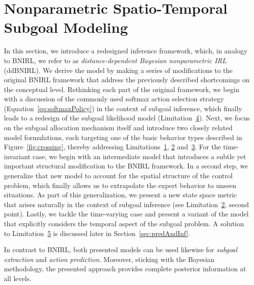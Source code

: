 \documentclass[twoside,11pt]{article}
\begin{document}
\section{Nonparametric Spatio-Temporal Subgoal Modeling}
\label{sec:ddBNIRL}
In this section, we introduce 
%
a redesigned inference framework, which, in analogy to BNIRL, we refer to as \textit{distance-dependent Bayesian nonparametric IRL} (ddBNIRL). %
We derive the model by making a series of modifications to the original BNIRL framework %
that address the previously described shortcomings %
%
on the conceptual level. %
Rethinking each part of the original framework, we begin with a discussion of the commonly used softmax action selection strategy (Equation~\ref{eq:softmaxPolicy}) in the context of subgoal %
inference, which finally leads to a redesign of the subgoal likelihood model %
(Limitation~\hyperref[phantom:lim4]{4}). Next, we focus on the subgoal allocation mechanism itself and introduce two %
closely related model formulations, %
each targeting one of the basic behavior types described in Figure~\ref{fig:crossing}, thereby addressing Limitations~\hyperref[phantom:lim1]{1}, \hyperref[phantom:lim2]{2} and~\hyperref[phantom:lim3]{3}. 
For the time-invariant case, we begin with an intermediate model that introduces a subtle yet important structural modification to the BNIRL framework. In a second step, we generalize that new model to account for the spatial structure of the %
control problem, which finally allows us to extrapolate the expert behavior to unseen situations. As part of this generalization, we present a new state space metric that arises naturally in the context of subgoal inference (see Limitation~\hyperref[phantom:lim2]{2}, second point). Lastly, we tackle the time-varying case and present a variant of the model that %
explicitly considers the temporal aspect of the subgoal problem. A solution to Limitation~\hyperref[phantom:lim5]{5} is discussed later in Section~\ref{sec:predAndInf}.

 In contrast to BNIRL, %
 both presented models can be used likewise for \textit{subgoal extraction} and \textit{action prediction}. Moreover, %
 sticking with the Bayesian methodology, the presented approach provides complete posterior information at all levels. 
\end{document}
